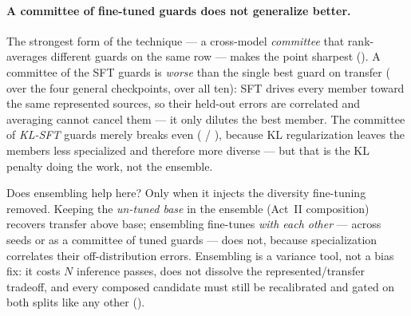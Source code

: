 \paragraph{A committee of fine-tuned guards does not generalize better.} The strongest form of the
technique --- a cross-model \emph{committee} that rank-averages different guards on the same row --- makes
the point sharpest (). A committee of the SFT guards is \emph{worse} than
the single best guard on transfer (\EnsCommSFTvsBestGen{} over the four general checkpoints,
\EnsCommSFTvsBestAll{} over all ten): SFT drives every member toward the same represented sources, so their
held-out errors are correlated and averaging cannot cancel them --- it only dilutes the best member. The
committee of \emph{KL-SFT} guards merely breaks even (\EnsCommKLvsBestGen{} / \EnsCommKLvsBestAll{}),
because KL regularization leaves the members less specialized and therefore more diverse --- but that is
the KL penalty doing the work, not the ensemble.



\begin{takeaway}{Does ensembling help here?}
Only when it injects the diversity fine-tuning removed. Keeping the \emph{un-tuned base} in the ensemble
(Act~II composition) recovers transfer above base; ensembling fine-tunes \emph{with each other} --- across
seeds or as a committee of tuned guards --- does not, because specialization correlates their
off-distribution errors. Ensembling is a variance tool, not a bias fix: it costs $N$ inference passes,
does not dissolve the represented/transfer tradeoff, and every composed candidate must still be
recalibrated and gated on both splits like any other ().
\end{takeaway}

